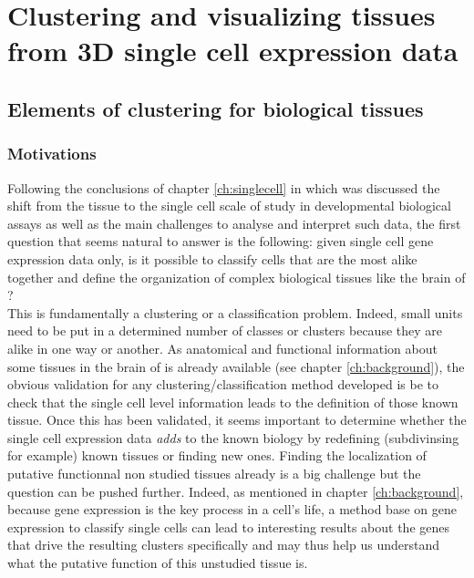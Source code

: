 \chapter{Clustering and visualizing tissues from 3D single cell expression data}\label{ch:non_spatial_clustering_visualization} 
\section{Elements of clustering for biological tissues}
	\subsection{Motivations}
	Following the conclusions of chapter \ref{ch:singlecell} in which was discussed the shift from the tissue to the single cell scale of study in developmental biological assays as well as the main challenges to analyse and interpret such data, the first question that seems natural to answer is the following: given single cell gene expression data only, is it possible to classify cells that are the most alike together and define the organization of complex biological tissues like the brain of \platyfull{}?\\
	
	This is fundamentally a clustering or a classification problem. Indeed, small units need to be put in a determined number of classes or clusters because they are alike in one way or another. As anatomical and functional information about some tissues in the brain of \platy{} is already available (see chapter \ref{ch:background}), the obvious validation for any clustering/classification method developed is be to check that the single cell level information leads to the definition of those known tissue. Once this has been validated, it seems important to determine whether the single cell expression data \emph{adds} to the known biology by redefining (subdivinsing for example) known tissues or finding new ones. Finding the localization of putative functionnal non studied tissues already is a big challenge but the question can be pushed further. Indeed, as mentioned in chapter \ref{ch:background}, because gene expression is the key process in a cell's life, a method base on gene expression to classify single cells can lead to interesting results about the genes that drive the resulting clusters specifically and may thus help us understand what the putative function of this unstudied tissue is.

